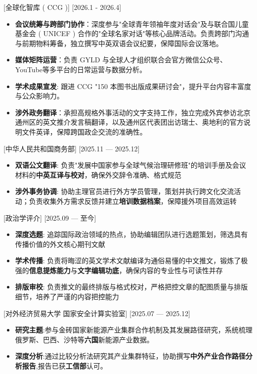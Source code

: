 \documentclass[a4paper]{resume}
\begin{document}
[全球化智库 ( CCG )]
[2026.1 - 2026.4]
{
  \begin{itemize}
    \item \textbf{会议统筹与跨部门协作}：深度参与"全球青年领袖年度对话会"及与联合国儿童基金会 ( UNICEF ) 合作的"全球名家对话"等核心品牌活动。负责跨部门沟通与前期物料筹备，独立撰写中英双语会议纪要，保障国际会议落地。
    \item \textbf{媒体矩阵运营}：负责 GYLD 与全球人才组织联合会官方微信公众号、YouTube等多平台的日常运营与数据分析。
    \item \textbf{学术成果宣发}: 跟进 CCG "150 本图书出版成果研讨会"，提升平台内容丰富度与公众影响力。
    \item \textbf{涉外政务翻译}：承担高规格外事活动的文字支持工作，独立完成外宾参访北京通州区的英文推介发言稿翻译，以及通州区代表团出访瑞士、奥地利的官方说明文件英译，保障跨国政企交流的准确性。
  \end{itemize}
}

[中华人民共和国商务部]
[2025.11 — 2025.12]
{
  \begin{itemize}
    \item \textbf{双语公文翻译}: 负责"发展中国家参与全球气候治理研修班"的培训手册及会议材料的\textbf{中英互译与校对}，确保外交辞令准确、格式规范
    \item \textbf{涉外事务协调}: 协助主理官员进行外方学员管理，策划并执行跨文化交流活动；负责收集外方需求反馈并建立\textbf{培训数据档案}，保障援外项目高效运转
  \end{itemize}
}

[政治学评介]
[2025.09 — 至今]
{
  \begin{itemize}
    \item \textbf{深度选题}: 追踪国际政治领域的热点，协助编辑团队进行选题策划，筛选具有传播价值的外文核心期刊文献
    \item \textbf{学术传播}: 负责将晦涩的英文学术文献编译为通俗易懂的中文推文，锻炼了极强的\textbf{信息提炼能力}与\textbf{文字编辑功底}，确保内容的专业性与可读性并存
    \item \textbf{排版审校}: 负责推文的最终排版与格式校对，严格把控文章的配图质量与排版细节，培养了严谨的内容把控能力
  \end{itemize}
}

[对外经济贸易大学 国家安全计算实验室]
[2025.07 — 2025.12]
{
  \begin{itemize}
    \item \textbf{研究主题}:参与金砖国家新能源产业集群合作机制及其发展路径研究，系统梳理俄罗斯、巴西、沙特等\textbf{六国}新能源产业数据。
    \item \textbf{深度分析}:通过比较分析法研究其产业集群特征，协助撰写\textbf{中外产业合作路径分析报告},报告已获\textbf{工信部}认可。
  \end{itemize}
}
\end{document}
